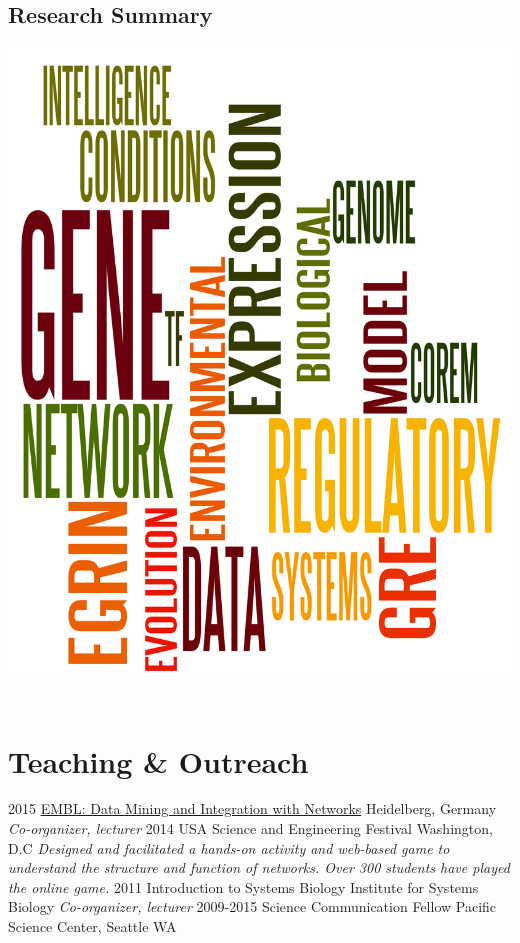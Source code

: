 \documentclass[]{friggeri-cv}
\begin{document}
\begin{aside}
  \section{Research Summary}
    \includegraphics[scale=0.28]{img/wordle_small.png}
    ~
\end{aside}

\section{Teaching \& Outreach}
\begin{entrylist}
    \entry
    {2015}
    {\href{http://scalefreegan.github.io/Teaching/DataIntegration/}{EMBL: Data Mining and Integration with Networks}}
    {Heidelberg, Germany}
    {\emph{Co-organizer, lecturer}}
  \entry
    {2014}
    {USA Science and Engineering Festival}
    {Washington, D.C}
    {\emph{Designed and facilitated a hands-on activity and web-based game to understand the structure and function of networks. Over 300 students have played the online game.}}
  \entry
    {2011}
    {Introduction to Systems Biology}
    {Institute for Systems Biology}
    {\emph{Co-organizer, lecturer}}
    \entry
    {2009-2015}
    {Science Communication Fellow}
    {Pacific Science Center, Seattle WA}
    {}
\end{entrylist}
\end{document}
